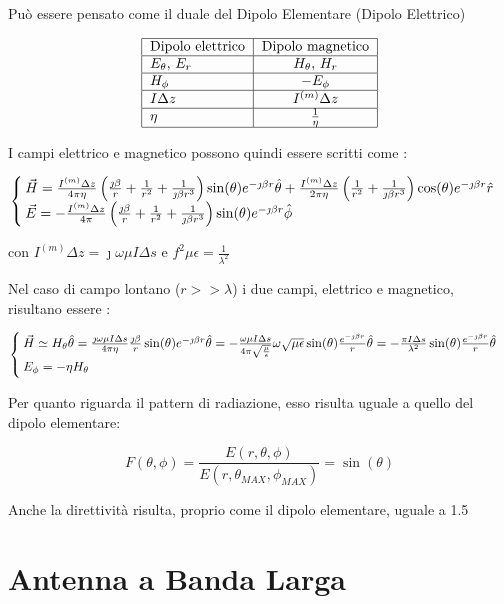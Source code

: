 Può essere pensato come il duale del Dipolo Elementare (Dipolo Elettrico)

\begin{equation}
\begin{tabular}{|l|c|r|}
\hline
Dipolo elettrico & Dipolo magnetico \\
\hline
$E_{\theta}$, $E_{r}$ & $H_{\theta}$, $H_{r}$ \\
\hline
$H_{\phi}$ & $-E_{\phi}$ \\
\hline
$I \Delta z$ & $I^{(m)} \Delta z$ \\
\hline
$\eta$ & $\frac{1}{\eta}$ \\
\hline
\end{tabular}
\end{equation}

I campi elettrico e magnetico possono quindi essere scritti come :

\begin{equation}
\begin{cases}
\vec{H} = \frac{I^{(m)} \Delta z}{4 \pi \eta} \left( \frac{\jmath \beta}{r} + \frac{1}{r^2} + \frac{1}{\jmath \beta r^3} \right) \sin (\theta) e^{-\jmath \beta r} \hat{\theta} + \frac{I^{(m)} \Delta z}{2 \pi \eta} \left(\frac{1}{r^2} + \frac{1}{\jmath \beta r^3} \right) \cos (\theta) e^{-\jmath \beta r} \hat{r} \\
\vec{E} = - \frac{I^{(m)} \Delta z}{4 \pi} \left( \frac{\jmath \beta}{r} + \frac{1}{r^2} + \frac{1}{\jmath \beta r^3} \right) \sin (\theta) e^{-\jmath \beta r} \hat{\phi} \end{cases}
\end{equation}


con $I^{(m)} \Delta z = \jmath \omega \mu I \Delta s$ e $f^2 \mu \epsilon = \frac{1}{\lambda^2}$

Nel caso di campo lontano ($r>>\lambda$) i due campi, elettrico e magnetico, risultano essere :

\begin{equation}
\begin{cases}
\vec{H} \simeq H_{\theta} \hat{\theta} = \frac{\jmath \omega \mu I \Delta s}{4 \pi \eta}  \frac{\jmath \beta}{r} \sin (\theta) e^{-\jmath \beta r} \hat{\theta}  = -\frac{\omega \mu I \Delta s}{4 \pi \sqrt{\frac{\mu}{\epsilon}}}  \omega \sqrt{\mu \epsilon} \sin (\theta) \frac{e^{-\jmath \beta r}}{r} \hat{\theta} = -\frac{\pi I \Delta s}{\lambda^2} \sin (\theta) \frac{e^{-\jmath \beta r}}{r} \hat{\theta}  \\
E_{\phi} = - \eta H_{\theta} \end{cases}
\end{equation}

Per quanto riguarda il pattern di radiazione, esso risulta uguale a quello del dipolo elementare:

\begin{equation}
F(\theta, \phi) = \frac{E(r, \theta, \phi)}{E(r, \theta_{MAX}, \phi_{MAX})} = \sin(\theta)
\end{equation}

Anche la direttività risulta, proprio come il dipolo elementare, uguale a 1.5



\section{Antenna a Banda Larga}
